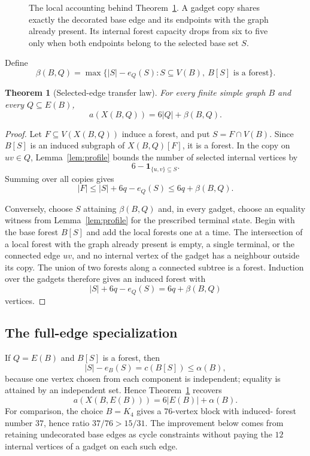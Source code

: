 \documentclass[11pt]{article}
\newtheorem{theorem}{Theorem}[section]
\theoremstyle{definition}
\theoremstyle{remark}
\newcommand{\ind}{\mathbf 1}
\begin{document}
\begin{figure}[htbp]
\begin{minipage}[c]{.40\textwidth}
\end{minipage}
\caption{The local accounting behind Theorem~\ref{thm:transfer}.  A gadget
copy shares exactly the decorated base edge and its endpoints with the graph
already present.  Its internal forest capacity drops from six to five only
when both endpoints belong to the selected base set $S$.}
\label{fig:substitution}
\end{figure}

Define
\[
 \beta(B,Q)=
 \max\bigl\{|S|-e_Q(S):S\subseteq V(B),\ B[S]\text{ is a forest}\bigr\}.
\]

\begin{theorem}[Selected-edge transfer law]\label{thm:transfer}
For every finite simple graph $B$ and every $Q\subseteq E(B)$,
\[
 \boxed{a(X(B,Q))=6|Q|+\beta(B,Q).}
\]
\end{theorem}

\begin{proof}
Let $F\subseteq V(X(B,Q))$ induce a forest, and put
$S=F\cap V(B)$.  Since $B[S]$ is an induced subgraph of $X(B,Q)[F]$, it is
a forest.  In the copy on $uv\in Q$, Lemma~\ref{lem:profile} bounds the
number of selected internal vertices by
\[
 6-\ind_{\{u,v\}\subseteq S}.
\]
Summing over all copies gives
\[
 |F|\le |S|+6q-e_Q(S)\le6q+\beta(B,Q).
\]

Conversely, choose $S$ attaining $\beta(B,Q)$ and, in every gadget, choose
an equality witness from Lemma~\ref{lem:profile} for the prescribed terminal
state.  Begin with the base forest $B[S]$ and add the local forests one at a
time.  The intersection of a local forest with the graph already present is
empty, a single terminal, or the connected edge $uv$, and no internal
vertex of the gadget has a neighbour outside its copy.  The union of two
forests along a connected subtree is a forest.  Induction over the gadgets
therefore gives an induced forest with
\[
 |S|+6q-e_Q(S)=6q+\beta(B,Q)
\]
vertices.
\end{proof}

\subsection{The full-edge specialization}

If $Q=E(B)$ and $B[S]$ is a forest, then
\[
 |S|-e_B(S)=c(B[S])\le\alpha(B),
\]
because one vertex chosen from each component is independent; equality is
attained by an independent set.  Hence Theorem~\ref{thm:transfer} recovers
\begin{equation}\label{eq:full}
 a(X(B,E(B)))=6|E(B)|+\alpha(B).
\end{equation}
For comparison, the choice $B=K_4$ gives a $76$-vertex block with induced-
forest number $37$, hence ratio $37/76>15/31$.  The improvement below comes
from retaining undecorated base edges as cycle constraints without paying the
$12$ internal vertices of a gadget on each such edge.
\end{document}
